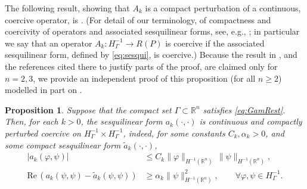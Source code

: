 \documentclass{birkjour}
\newtheorem{proposition}[theorem]{Proposition}
\theoremstyle{definition}
\theoremstyle{remark}
\numberwithin{equation}{section}
\newcommand{\R}{\mathbb{R}}
\newcommand{\rea}{\mathrm{Re}\,}
\begin{document}
The following result, showing that $A_k$ is a compact perturbation of a continuous, coercive operator, is \cite[Lem.~3.3]{caetano2025integral}. (For detail of our terminology, of compactness and coercivity of operators and associated sesquilinear forms, see, e.g., 
\cite[\S2.2]{CWHeMoBe:21}; in particular we say that an operator $A_k:H_\Gamma^{-1}\to R(P)$ is coercive if the associated sesquilinear form, defined by \eqref{eq:sesqui}, is coercive.) Because the result in  \cite{caetano2025integral}, and the references cited there to justify parts of the proof, are claimed only for $n=2,3$, we provide an independent proof of this proposition (for all $n\geq 2$) modelled in part on \cite[Thm.~6.1]{mclean2000strongly}. 
\begin{proposition} \label{prop:coer}
Suppose that the compact set $\Gamma\subset \R^n$ satisfies \eqref{eq:GamRest}. 
Then, for each $k>0$, the sesquilinear form $a_k(\cdot, \cdot)$ is continuous and compactly perturbed coercive on  $H^{-1}_\Gamma \times H^{-1}_\Gamma$, indeed, for some constants $C_k, \alpha_k > 0$, and some compact sesquilinear form $\tilde a_k(\cdot, \cdot)$,
\begin{align*}
|a_k(\varphi,\psi)| &\leq C_k \|\varphi\|_{H^{-1}(\R^n)}\, \|\psi\|_{H^{-1}(\R^n)},\\  \rea(a_k(\psi,\psi)-\tilde a_k(\psi,\psi)) &\geq \alpha_k \|\psi\|^2_{H^{-1}(\R^n)}, \qquad \forall \varphi,\psi\in H^{-1}_\Gamma.
\end{align*}
\end{proposition}
\end{document}
